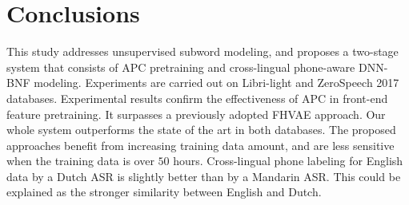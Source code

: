 \documentclass[a4paper]{article}
\begin{document}

\section{Conclusions}
This study addresses unsupervised subword modeling, and proposes a two-stage system that consists of APC pretraining and cross-lingual phone-aware DNN-BNF modeling.  
Experiments are carried out on Libri-light and ZeroSpeech 2017 databases. Experimental results confirm the effectiveness of APC in front-end feature pretraining. It surpasses a previously adopted FHVAE approach. Our whole system outperforms the state of the art in both databases. The proposed approaches benefit from increasing training data amount, and are less sensitive when the training data is over $50$ hours.  
Cross-lingual phone labeling for English data by a Dutch ASR is slightly better than by a Mandarin ASR. This could be explained as the stronger similarity between English and Dutch.  









\end{document}
